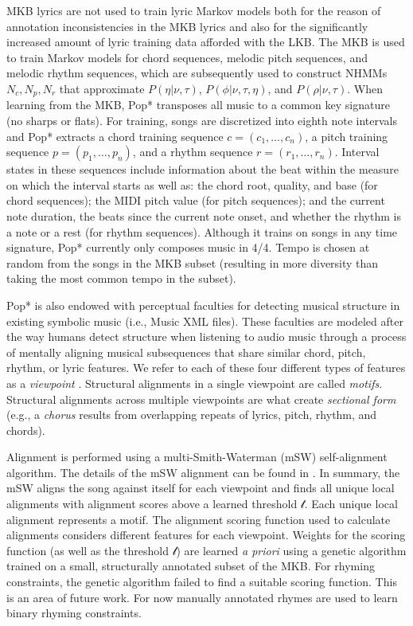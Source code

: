 \documentclass[phd,electronic,oneside,twosidetoc,letterpaper,chaptercenter,parttop,lof,lot]{byumsphd}
\begin{document}
MKB lyrics are not used to train lyric Markov models both for the reason of annotation inconsistencies in the MKB lyrics and also for the significantly increased amount of lyric training data afforded with the LKB. The MKB is used to train Markov models for chord sequences, melodic pitch sequences, and melodic rhythm sequences, which are subsequently used to construct NHMMs $N_c, N_p, N_r$ that approximate $P(\eta|\nu,\tau)$, $P(\phi|\nu,\tau,\eta)$, and $P(\rho|\nu,\tau)$. When learning from the MKB, Pop* transposes all music to a common key signature (no sharps or flats). For training, songs are discretized into eighth note intervals and Pop* extracts a chord training sequence $c=(c_1,\dots,c_n)$, a pitch training sequence $p=(p_1,\dots,p_n)$, and a rhythm sequence $r=(r_1,\dots,r_n)$. Interval states in these sequences include information about the beat within the measure on which the interval starts as well as: the chord root, quality, and base (for chord sequences); the MIDI pitch value (for pitch sequences); and the current note duration, the beats since the current note onset, and whether the rhythm is a note or a rest (for rhythm sequences). Although it trains on songs in any time signature, Pop* currently only composes music in 4/4. Tempo is chosen at random from the songs in the MKB subset (resulting in more diversity than taking the most common tempo in the subset).

Pop* is also endowed with perceptual faculties for detecting musical structure in existing symbolic music (i.e., Music XML files). These faculties are modeled after the way humans detect structure when listening to audio music through a process of mentally aligning musical subsequences that share similar chord, pitch, rhythm, or lyric features. We refer to each of these four different types of features as a \textit{viewpoint} \citep{conklin1995multiple}. Structural alignments in a single viewpoint are called \textit{motifs}. Structural alignments across multiple viewpoints are what create \textit{sectional form} (e.g., a \textit{chorus} results from overlapping repeats of lyrics, pitch, rhythm, and chords).

Alignment is performed using a multi-Smith-Waterman (mSW) self-alignment algorithm. The details of the mSW alignment can be found in \cite{bodily2018abstract}. In summary, the mSW aligns the song against itself for each viewpoint and finds all unique local alignments with alignment scores above a learned threshold $\mathcal{t}$. Each unique local alignment represents a motif. The alignment scoring function used to calculate alignments considers different features for each viewpoint. Weights for the scoring function (as well as the threshold $\mathcal{t}$) are learned \textit{a priori} using a genetic algorithm trained on a small, structurally annotated subset of the MKB. For rhyming constraints, the genetic algorithm failed to find a suitable scoring function. This is an area of future work. For now manually annotated rhymes are used to learn binary rhyming constraints.
\end{document}
